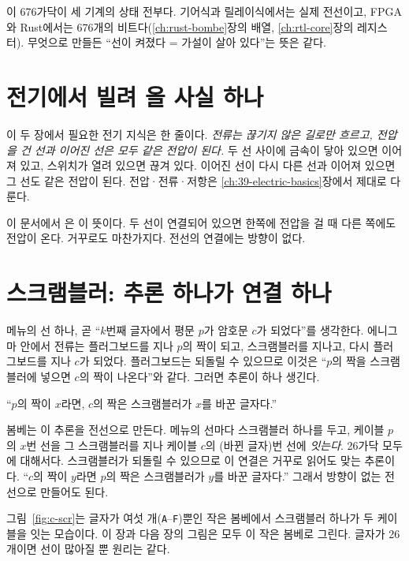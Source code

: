 \Ours 이 676가닥이 세 기계의 상태 전부다. 기어식과 릴레이식에서는 실제 전선이고, FPGA와 Rust에서는 676개의
비트다(\ref{ch:rust-bombe}장의  배열, \ref{ch:rtl-core}장의  레지스터). 무엇으로
만들든 ``선이 켜졌다 = 가설이 살아 있다''는 뜻은 같다.

\section{전기에서 빌려 올 사실 하나}\label{sec:c-current}

이 두 장에서 필요한 전기 지식은 한 줄이다. \emph{전류는 끊기지 않은 길로만 흐르고, 전압을 건 선과 이어진
선은 모두 같은 전압이 된다.} 두 선 사이에 금속이 닿아 있으면 이어져 있고, 스위치가 열려 있으면 끊겨 있다.
이어진 선이 다시 다른 선과 이어져 있으면 그 선도 같은 전압이 된다. 전압·전류·저항은 \ref{ch:39-electric-basics}장에서
제대로 다룬다.

이 문서에서 은 이 뜻이다. 두 선이 연결되어 있으면 한쪽에 전압을 걸 때 다른 쪽에도
전압이 온다. 거꾸로도 마찬가지다. 전선의 연결에는 방향이 없다.

\section{스크램블러: 추론 하나가 연결 하나}\label{sec:c-scrambler}

\Why 메뉴의 선 하나, 곧 ``$k$번째 글자에서 평문 $p$가 암호문 $c$가 되었다''를 생각한다. 에니그마 안에서 전류는
플러그보드를 지나 $p$의 짝이 되고, 스크램블러를 지나고, 다시 플러그보드를 지나 $c$가 되었다. 플러그보드는
되돌릴 수 있으므로 이것은 ``$p$의 짝을 스크램블러에 넣으면 $c$의 짝이 나온다''와 같다. 그러면 추론이 하나
생긴다.

\begin{center}
``$p$의 짝이 $x$라면, $c$의 짝은 스크램블러가 $x$를 바꾼 글자다.''
\end{center}

봄베는 이 추론을 전선으로 만든다. 메뉴의 선마다 스크램블러 하나를 두고, 케이블 $p$의 $x$번 선을 그
스크램블러를 지나 케이블 $c$의 (바뀐 글자)번 선에 \emph{잇는다}. 26가닥 모두에 대해서다. 스크램블러가
되돌릴 수 있으므로 이 연결은 거꾸로 읽어도 맞는 추론이다. ``$c$의 짝이 $y$라면 $p$의 짝은 스크램블러가 $y$를
바꾼 글자다.'' 그래서 방향이 없는 전선으로 만들어도 된다.

그림~\ref{fig:c-scr}는 글자가 여섯 개(\texttt{A}--\texttt{F})뿐인 작은 봄베에서 스크램블러 하나가 두 케이블을
잇는 모습이다. 이 장과 다음 장의 그림은 모두 이 작은 봄베로 그린다. 글자가 26개이면 선이 많아질 뿐 원리는 같다.

